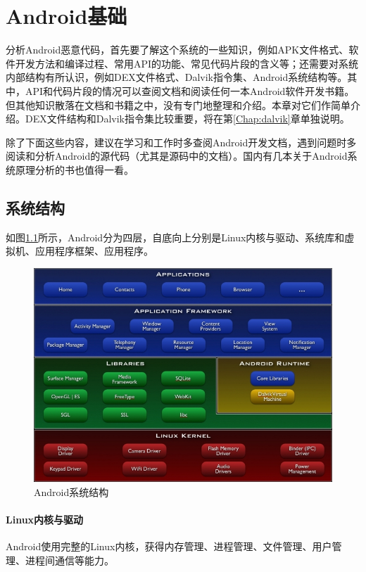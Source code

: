 \chapter{Android基础}
分析Android恶意代码，首先要了解这个系统的一些知识，例如APK文件格式、软件开发方法和编译过程、常用API的功能、常见代码片段的含义等；还需要对系统内部结构有所认识，例如DEX文件格式、Dalvik指令集、Android系统结构等。其中，API和代码片段的情况可以查阅文档和阅读任何一本Android软件开发书籍。但其他知识散落在文档和书籍之中，没有专门地整理和介绍。本章对它们作简单介绍。DEX文件结构和Dalvik指令集比较重要，将在第\ref{Chap:dalvik}章单独说明。

除了下面这些内容，建议在学习和工作时多查阅Android开发文档，遇到问题时多阅读和分析Android的源代码（尤其是源码中的文档）。国内有几本关于Android系统原理分析的书\cite{android_jishuneimu, android_shenrulijie, android_neihepouxi}也值得一看。

\section{系统结构}
如图\ref{Fig:system-architecture}所示，Android分为四层，自底向上分别是Linux内核与驱动、系统库和虚拟机、应用程序框架、应用程序。
\begin{figure}[htbp]
  \centering
  \includegraphics[width=14cm]{image/system-architecture.jpg}
  \caption{Android系统结构}
  \label{Fig:system-architecture}
\end{figure}

\subsubsection{Linux内核与驱动}
Android使用完整的Linux内核，获得内存管理、进程管理、文件管理、用户管理、进程间通信等能力。


